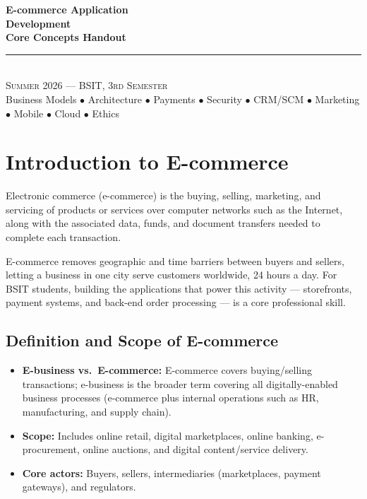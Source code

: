 \documentclass[11pt,a4paper]{article}
\begin{document}
\begin{center}
\vspace*{0.5cm}
{\Huge\bfseries\textcolor{primary}{E-commerce Application}}\\[4pt]
{\Huge\bfseries\textcolor{primary}{Development}}\\[8pt]
{\Huge\bfseries\textcolor{primary}{Core Concepts Handout}}\\[16pt]
{\color{secondary}\rule{0.68\textwidth}{1.5pt}}\\[14pt]
{\Large\textsc{Summer 2026 --- BSIT, 3rd Semester}}\\[8pt]
{\large\textcolor{gray!70!black}{Business Models $\bullet$ Architecture $\bullet$ Payments $\bullet$ Security $\bullet$ CRM/SCM $\bullet$ Marketing $\bullet$ Mobile $\bullet$ Cloud $\bullet$ Ethics}}
\vspace{0.3cm}
\end{center}

\tableofcontents
\newpage

\section{Introduction to E-commerce}

\begin{definitionbox}[E-commerce]
Electronic commerce (e-commerce) is the buying, selling, marketing, and servicing of products or services over computer networks such as the Internet, along with the associated data, funds, and document transfers needed to complete each transaction.
\end{definitionbox}

\begin{conceptbox}
E-commerce removes geographic and time barriers between buyers and sellers, letting a business in one city serve customers worldwide, 24 hours a day. For BSIT students, building the applications that power this activity --- storefronts, payment systems, and back-end order processing --- is a core professional skill.
\end{conceptbox}

\subsection{Definition and Scope of E-commerce}
\begin{itemize}[leftmargin=*]
  \item \textbf{E-business vs.\ E-commerce:} E-commerce covers buying/selling transactions; e-business is the broader term covering all digitally-enabled business processes (e-commerce plus internal operations such as HR, manufacturing, and supply chain).
  \item \textbf{Scope:} Includes online retail, digital marketplaces, online banking, e-procurement, online auctions, and digital content/service delivery.
  \item \textbf{Core actors:} Buyers, sellers, intermediaries (marketplaces, payment gateways), and regulators.
\end{itemize}
\end{document}
